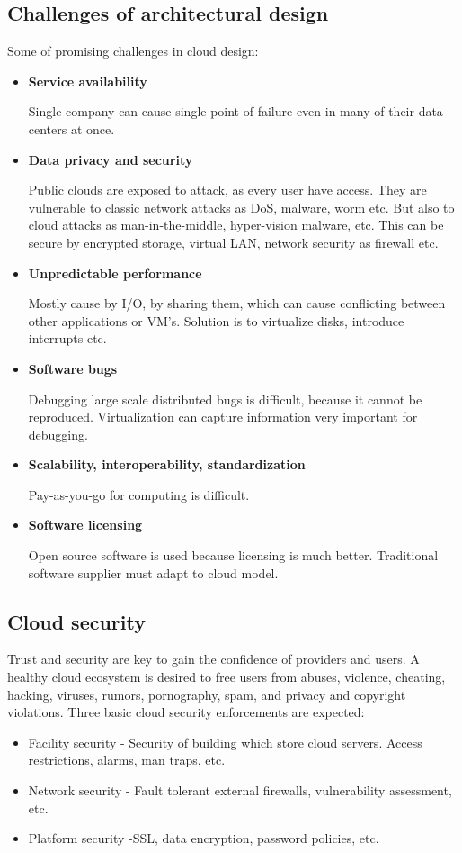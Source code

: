 \documentclass[12pt]{report}
\begin{document}
\subsection{Challenges of architectural design}
Some of promising challenges in cloud design:
\begin{itemize}
\item \textbf{Service availability}

			Single company can cause single point of failure even in many of their data centers at once.
\item \textbf{Data privacy and security}

			Public clouds are exposed to attack, as every user have access. They are vulnerable to classic network attacks as DoS, malware, worm etc. But also to cloud attacks as man-in-the-middle, hyper-vision malware, etc. This can be secure by encrypted storage, virtual LAN, network security as firewall etc.
\item \textbf{Unpredictable performance}

			Mostly cause by I/O, by sharing them, which can cause conflicting between other applications or VM's. Solution is to virtualize disks, introduce interrupts etc.
\item \textbf{Software bugs}

			Debugging large scale distributed bugs is difficult, because it cannot be reproduced. Virtualization can capture information very important for debugging.
\item \textbf{Scalability, interoperability, standardization}

			Pay-as-you-go for computing is difficult.
\item \textbf{Software licensing}

			Open source software is used because licensing is much better. Traditional software supplier must adapt to cloud model.
\end{itemize}

\subsection{Cloud security}

Trust and security are key to gain the confidence of providers and users. A healthy cloud ecosystem is desired to free users from abuses, violence, cheating, hacking, viruses,
rumors, pornography, spam, and privacy and copyright violations. 
Three basic cloud security enforcements are expected:
\begin{itemize}
\item Facility security - Security of building which store cloud servers. Access restrictions, alarms, man traps, etc.
\item Network security - Fault tolerant external firewalls, vulnerability assessment, etc.
\item Platform security -SSL, data encryption, password policies, etc.
\end{itemize}
\end{document}
